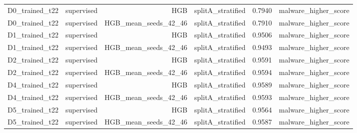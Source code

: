 \begin{table}[ht]
\begin{tabular}{lrrrrr}
D0\_trained\_t22 & supervised & HGB & splitA\_stratified & 0.7940 & malware\_higher\_score \\
D0\_trained\_t22 & supervised & HGB\_mean\_seeds\_42\_46 & splitA\_stratified & 0.7910 & malware\_higher\_score \\
D1\_trained\_t22 & supervised & HGB & splitA\_stratified & 0.9506 & malware\_higher\_score \\
D1\_trained\_t22 & supervised & HGB\_mean\_seeds\_42\_46 & splitA\_stratified & 0.9493 & malware\_higher\_score \\
D2\_trained\_t22 & supervised & HGB & splitA\_stratified & 0.9591 & malware\_higher\_score \\
D2\_trained\_t22 & supervised & HGB\_mean\_seeds\_42\_46 & splitA\_stratified & 0.9594 & malware\_higher\_score \\
D4\_trained\_t22 & supervised & HGB & splitA\_stratified & 0.9589 & malware\_higher\_score \\
D4\_trained\_t22 & supervised & HGB\_mean\_seeds\_42\_46 & splitA\_stratified & 0.9593 & malware\_higher\_score \\
D5\_trained\_t22 & supervised & HGB & splitA\_stratified & 0.9564 & malware\_higher\_score \\
D5\_trained\_t22 & supervised & HGB\_mean\_seeds\_42\_46 & splitA\_stratified & 0.9587 & malware\_higher\_score \\
\bottomrule
\end{tabular}
\end{table}
